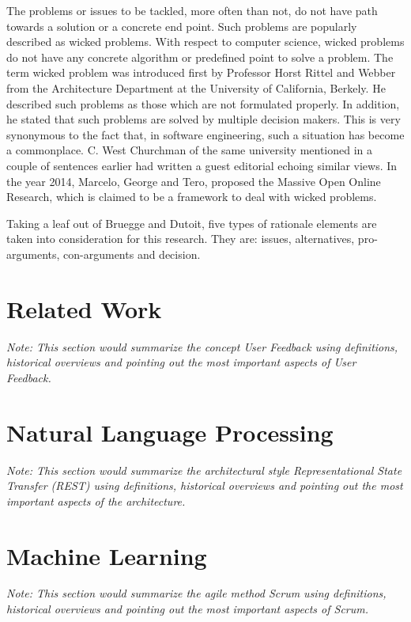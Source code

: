 \documentclass[a4paper,12pt,twoside]{report}
\begin{document}
The problems or issues to be tackled, more often than not, do not have path towards a solution or a concrete end point. Such problems are popularly described as wicked problems. With respect to computer science, wicked problems do not have any concrete algorithm or predefined point to solve a problem. The term wicked problem was introduced first by Professor Horst Rittel and Webber from the Architecture Department at the University of California, Berkely. He described such problems as those which are not formulated properly. In addition, he stated that such problems are solved by multiple decision makers. This is very synonymous to the fact that, in software engineering, such a situation has become a commonplace. C. West Churchman of the same university mentioned in a couple of sentences earlier had written a guest editorial echoing similar views. In the year 2014, Marcelo, George and Tero, proposed the Massive Open Online Research, which is claimed to be a framework to deal with wicked problems. 

Taking a leaf out of Bruegge and Dutoit, five types of rationale elements are taken into consideration for this research. They are: issues, alternatives, pro-arguments, con-arguments and decision. 

\section{Related Work}

\textit{Note: This section would summarize the concept User Feedback using definitions, historical overviews and pointing out the most important aspects of User Feedback.}

\section{Natural Language Processing}

\textit{Note: This section would summarize the architectural style Representational State Transfer (REST) using definitions, historical overviews and pointing out the most important aspects of the architecture.}

\section{Machine Learning}

\textit{Note: This section would summarize the agile method Scrum using definitions, historical overviews and pointing out the most important aspects of Scrum.}
\end{document}
